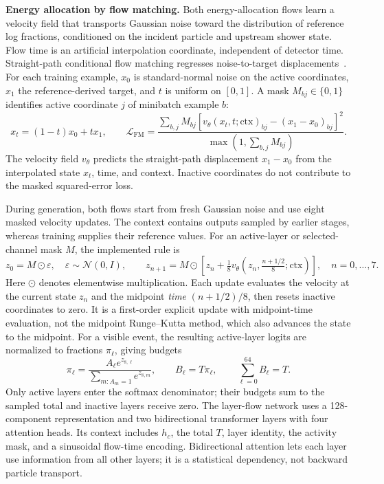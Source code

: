 \documentclass[10pt]{article}
\begin{document}
\textbf{Energy allocation by flow matching.} Both energy-allocation flows learn a velocity field that transports Gaussian noise toward the distribution of reference log fractions, conditioned on the incident particle and upstream shower state. Flow time is an artificial interpolation coordinate, independent of detector time. Straight-path conditional flow matching regresses noise-to-target displacements~\cite{flowmatching,rectifiedflow}. For each training example, $x_0$ is standard-normal noise on the active coordinates, $x_1$ the reference-derived target, and $t$ is uniform on $[0,1]$. A mask $M_{bj}\in\{0,1\}$ identifies active coordinate $j$ of minibatch example $b$:
\begin{equation}
 x_t=(1-t)x_0+t x_1,\qquad
 \mathcal L_{\mathrm{FM}}=
 \frac{\sum_{b,j}M_{bj}
 [v_\theta(x_t,t;\mathrm{ctx})_{bj}-(x_1-x_0)_{bj}]^2}
 {\max(1,\sum_{b,j}M_{bj})}.
 \label{eq:cfm}
\end{equation}
The velocity field $v_\theta$ predicts the straight-path displacement $x_1-x_0$ from the interpolated state $x_t$, time, and context. Inactive coordinates do not contribute to the masked squared-error loss.

During generation, both flows start from fresh Gaussian noise and use eight masked velocity updates. The context contains outputs sampled by earlier stages, whereas training supplies their reference values. For an active-layer or selected-channel mask $M$, the implemented rule is
\begin{equation}
 z_0=M\odot\varepsilon,\quad \varepsilon\sim\mathcal N(0,I),\qquad
 z_{n+1}=M\odot\left[z_n+\tfrac18
 v_\theta\!\left(z_n,\tfrac{n+1/2}{8};\mathrm{ctx}\right)\right],
 \quad n=0,\ldots,7.
 \label{eq:flow_steps}
\end{equation}
Here $\odot$ denotes elementwise multiplication. Each update evaluates the velocity at the current state $z_n$ and the midpoint \emph{time} $(n+1/2)/8$, then resets inactive coordinates to zero. It is a first-order explicit update with midpoint-time evaluation, not the midpoint Runge--Kutta method, which also advances the state to the midpoint. For a visible event, the resulting active-layer logits are normalized to fractions $\pi_\ell$, giving budgets
\begin{equation}
 \pi_\ell=\frac{A_\ell e^{z_{8,\ell}}}
 {\sum_{m:A_m=1}e^{z_{8,m}}},\qquad
 B_\ell=T\pi_\ell,\qquad \sum_{\ell=0}^{64}B_\ell=T.
 \label{eq:layer_budget}
\end{equation}
Only active layers enter the softmax denominator; their budgets sum to the sampled total and inactive layers receive zero. The layer-flow network uses a 128-component representation and two bidirectional transformer layers with four attention heads. Its context includes $h_c$, the total $T$, layer identity, the activity mask, and a sinusoidal flow-time encoding. Bidirectional attention lets each layer use information from all other layers; it is a statistical dependency, not backward particle transport.
\end{document}
